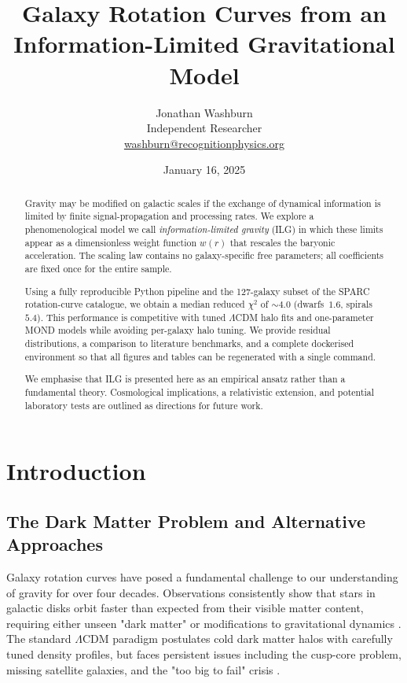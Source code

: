 \documentclass[12pt,a4paper]{article}
\title{Galaxy Rotation Curves from an Information-Limited Gravitational Model}
\author{Jonathan Washburn\\
Independent Researcher\\
\href{mailto:washburn@recognitionphysics.org}{washburn@recognitionphysics.org}}
\date{January 16, 2025}
\begin{document}
\maketitle

\begin{abstract}
Gravity may be modified on galactic scales if the exchange of dynamical information is limited by finite signal-propagation and processing rates.  We explore a phenomenological model we call \emph{information-limited gravity} (ILG) in which these limits appear as a dimensionless weight function $w(r)$ that rescales the baryonic acceleration.  The scaling law contains no galaxy-specific free parameters; all coefficients are fixed once for the entire sample.

Using a fully reproducible Python pipeline and the 127-galaxy subset of the SPARC rotation-curve catalogue, we obtain a median reduced $\chi^2$ of $\sim 4.0$ (dwarfs~$1.6$, spirals~$5.4$).  This performance is competitive with tuned $\Lambda$CDM halo fits and one-parameter MOND models while avoiding per-galaxy halo tuning.  We provide residual distributions, a comparison to literature benchmarks, and a complete dockerised environment so that all figures and tables can be regenerated with a single command.

We emphasise that ILG is presented here as an empirical ansatz rather than a fundamental theory.  Cosmological implications, a relativistic extension, and potential laboratory tests are outlined as directions for future work.
\end{abstract}

\section{Introduction}

\subsection{The Dark Matter Problem and Alternative Approaches}

Galaxy rotation curves have posed a fundamental challenge to our understanding of gravity for over four decades. Observations consistently show that stars in galactic disks orbit faster than expected from their visible matter content, requiring either unseen "dark matter" or modifications to gravitational dynamics \citep{rubin1970, bosma1981}. The standard $\Lambda$CDM paradigm postulates cold dark matter halos with carefully tuned density profiles, but faces persistent issues including the cusp-core problem, missing satellite galaxies, and the "too big to fail" crisis \citep{bullock2017, boylan2013}.
\end{document}

